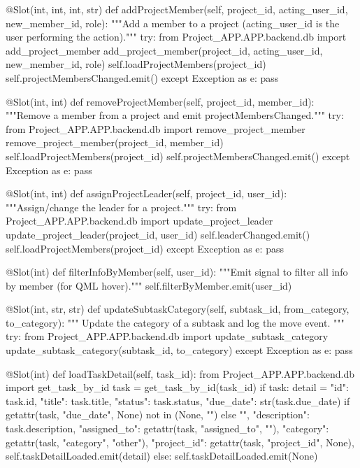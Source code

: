 \documentclass{report}
\begin{document}
\begin{python}
    @Slot(int, int, int, str)
    def addProjectMember(self, project_id, acting_user_id, new_member_id, role):
        """Add a member to a project (acting_user_id is the user performing the action)."""
        try:
            from Project_APP.APP.backend.db import add_project_member
            add_project_member(project_id, acting_user_id, new_member_id, role)
            self.loadProjectMembers(project_id)
            self.projectMembersChanged.emit()
        except Exception as e:
            pass

    @Slot(int, int)
    def removeProjectMember(self, project_id, member_id):
        """Remove a member from a project and emit projectMembersChanged."""
        try:
            from Project_APP.APP.backend.db import remove_project_member
            remove_project_member(project_id, member_id)
            self.loadProjectMembers(project_id)
            self.projectMembersChanged.emit()
        except Exception as e:
            pass

    @Slot(int, int)
    def assignProjectLeader(self, project_id, user_id):
        """Assign/change the leader for a project."""
        try:
            from Project_APP.APP.backend.db import update_project_leader
            update_project_leader(project_id, user_id)
            self.leaderChanged.emit()
            self.loadProjectMembers(project_id)
        except Exception as e:
            pass

    @Slot(int)
    def filterInfoByMember(self, user_id):
        """Emit signal to filter all info by member (for QML hover)."""
        self.filterByMember.emit(user_id)

    @Slot(int, str, str)
    def updateSubtaskCategory(self, subtask_id, from_category, to_category):
        """
        Update the category of a subtask and log the move event.
        """
        try:
            from Project_APP.APP.backend.db import update_subtask_category
            update_subtask_category(subtask_id, to_category)
        except Exception as e:
            pass

    @Slot(int)
    def loadTaskDetail(self, task_id):
        from Project_APP.APP.backend.db import get_task_by_id
        task = get_task_by_id(task_id)
        if task:
            detail = {
                "id": task.id,
                "title": task.title,
                "status": task.status,
                "due_date": str(task.due_date) if getattr(task, "due_date", None) not in (None, "") else "",
                "description": task.description,
                "assigned_to": getattr(task, "assigned_to", ""),
                "category": getattr(task, "category", "other"),
                "project_id": getattr(task, "project_id", None),
            }
            self.taskDetailLoaded.emit(detail)
        else:
            self.taskDetailLoaded.emit(None)


\end{python}
\end{document}
